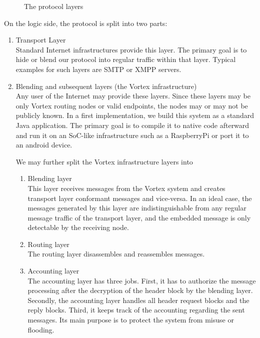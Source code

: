 \begin{figure}[H]
	\resizebox{0.95\textwidth}{!}{}
	\caption{The protocol layers}
	\label{fig:protocolLayers}
\end{figure}

On the logic side, the protocol is split into two parts:
\begin{enumerate}
	\item Transport Layer\\
	Standard Internet infrastructures provide this layer. The primary goal is to hide or blend our protocol into regular traffic within that layer. Typical examples for such layers are SMTP or XMPP servers.
	\item Blending and subsequent layers (the Vortex infrastructure)\\
	Any user of the Internet may provide these layers. Since these layers may be only Vortex routing nodes or valid endpoints, the nodes may or may not be publicly known. In a first implementation, we build this system as a standard Java application. The primary goal is to compile it to native code afterward and run it on an SoC-like infrastructure such as a RaspberryPi or port it to an android device.
	
	We may further split the Vortex infrastructure layers into
	\begin{enumerate}
		\item  Blending layer\\
		This layer receives messages from the Vortex system and creates transport layer conformant messages and vice-versa. In an ideal case, the messages generated by this layer are indistinguishable from any regular message traffic of the transport layer, and the embedded message is only detectable by the receiving node.
		\item Routing layer\\
		The routing layer disassembles and reassembles messages. 
		\item Accounting layer\\
		The accounting layer has three jobs. First, it has to authorize the message processing after the decryption of the header block by the blending layer. Secondly, the accounting layer handles all header request blocks and the reply blocks. Third, it keeps track of the accounting regarding the sent messages. Its main purpose is to protect the system from misuse or flooding.    
	\end{enumerate}
\end{enumerate}

